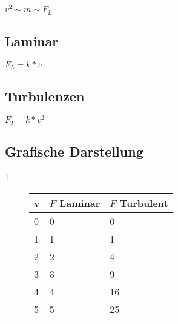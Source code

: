 \(v^2 \sim m \sim F_L\)

\subsection{Laminar}

\(F_L = k * v\)

\subsection{Turbulenzen}

\(F_T = k * v^2 \)

\subsection{Grafische Darstellung}

\ref{fig:tablegraph}

\begin{figure}
	\centering
	\begin{tabular}{|l|l|l|}
		\hline
		\textbf{v} & \textbf{\(F\) Laminar} & \textbf{\(F\) Turbulent} \\
		\hline
		0 & 0 & 0\\ \hline
		1 & 1 & 1\\ \hline
		2 & 2 & 4\\ \hline
		3 & 3 & 9\\ \hline
		4 & 4 & 16\\ \hline
		5 & 5 & 25\\ \hline
		
	\end{tabular}
	\caption{\label{fig:tablegraph}}
\end{figure}

